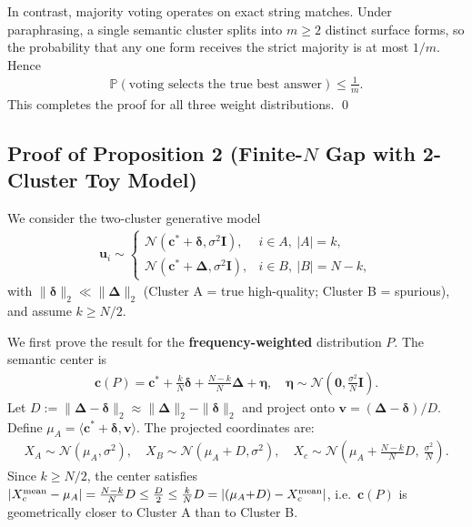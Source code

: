 In contrast, majority voting operates on exact string matches. Under paraphrasing, a single semantic cluster splits into \(m \geq 2\) distinct surface forms, so the probability that any one form receives the strict majority is at most \(1/m\). Hence
\begin{align}
    \mathbb{P}(\text{voting selects the true best answer}) \leq \frac{1}{m}.
\end{align}
This completes the proof for all three weight distributions.
\qed

\subsection{Proof of Proposition 2 (Finite-\(N\) Gap with 2-Cluster Toy Model)}\label{app:proof_prop2}
We consider the two-cluster generative model
\begin{align}
\mathbf{u}_i \sim
\begin{cases}
\mathcal{N}(\mathbf{c}^* + \boldsymbol{\delta}, \sigma^2 \mathbf{I}), & i \in A,\ |A| = k, \\
\mathcal{N}(\mathbf{c}^* + \boldsymbol{\Delta}, \sigma^2 \mathbf{I}), & i \in B,\ |B| = N-k,
\end{cases}
\end{align}
with \(\|\boldsymbol{\delta}\|_2 \ll \|\boldsymbol{\Delta}\|_2\) (Cluster A = true high-quality; Cluster B = spurious), and assume \(k \geq N/2\).

We first prove the result for the \textbf{frequency-weighted} distribution \(P\). The semantic center is
\begin{align}
    \mathbf{c}(P) = \mathbf{c}^* + \tfrac{k}{N}\boldsymbol{\delta} + \tfrac{N-k}{N}\boldsymbol{\Delta} + \boldsymbol{\eta},
    \quad \boldsymbol{\eta} \sim \mathcal{N}\!\left(\mathbf{0}, \tfrac{\sigma^2}{N}\mathbf{I}\right).
\end{align}
Let \(D := \|\boldsymbol{\Delta} - \boldsymbol{\delta}\|_2 \approx \|\boldsymbol{\Delta}\|_2 - \|\boldsymbol{\delta}\|_2\) and project onto \(\mathbf{v} = (\boldsymbol{\Delta} - \boldsymbol{\delta})/D\). Define \(\mu_A = \langle \mathbf{c}^* + \boldsymbol{\delta}, \mathbf{v}\rangle\). The projected coordinates are:
\begin{align}
    X_A \sim \mathcal{N}(\mu_A, \sigma^2), \quad
    X_B \sim \mathcal{N}(\mu_A{+}D, \sigma^2), \quad
    X_c \sim \mathcal{N}\!\left(\mu_A + \tfrac{N-k}{N}D,\ \tfrac{\sigma^2}{N}\right).
\end{align}
Since \(k \geq N/2\), the center satisfies \(|X_c^{\rm mean} - \mu_A| = \tfrac{N-k}{N}D \leq \tfrac{D}{2} \leq \tfrac{k}{N}D = |(\mu_A{+}D) - X_c^{\rm mean}|\), i.e.\ \(\mathbf{c}(P)\) is geometrically closer to Cluster A than to Cluster B.

